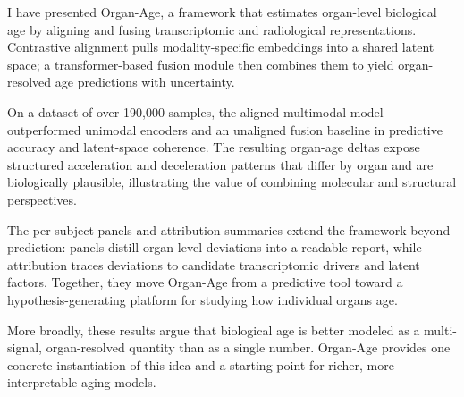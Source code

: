 \documentclass[10pt,twocolumn]{article}
\begin{document}
I have presented Organ-Age, a framework that estimates organ-level biological age by aligning and
fusing transcriptomic and radiological representations. Contrastive alignment pulls modality-specific
embeddings into a shared latent space; a transformer-based fusion module then combines them to yield
organ-resolved age predictions with uncertainty.

On a dataset of over 190{,}000 samples, the aligned multimodal model outperformed unimodal encoders
and an unaligned fusion baseline in predictive accuracy and latent-space coherence. The resulting
organ-age deltas expose structured acceleration and deceleration patterns that differ by organ and
are biologically plausible, illustrating the value of combining molecular and structural perspectives.

The per-subject panels and attribution summaries extend the framework beyond prediction:
panels distill organ-level deviations into a readable report, while attribution traces deviations to
candidate transcriptomic drivers and latent factors. Together, they move Organ-Age from a predictive
tool toward a hypothesis-generating platform for studying how individual organs age.

More broadly, these results argue that biological age is better modeled as a multi-signal,
organ-resolved quantity than as a single number. Organ-Age provides one concrete instantiation of
this idea and a starting point for richer, more interpretable aging models.



\end{document}
